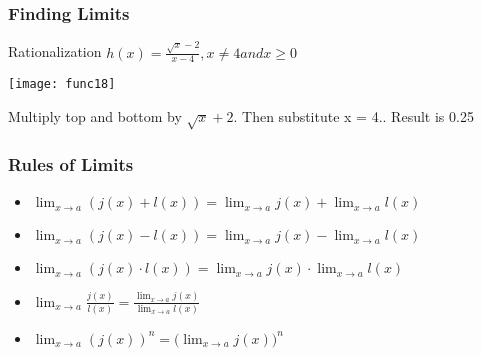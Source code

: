  \begin{frame}[fragile]\frametitle{Finding Limits}
Rationalization
$h(x) = \frac{\sqrt x - 2}{x - 4}, x \neq 4 and x \geq 0$
\begin{center}
\texttt{[image: func18]}
\end{center}
Multiply top and bottom by $\sqrt x + 2$. Then substitute x = 4.. Result is 0.25
\end{frame}


 \begin{frame}[fragile]\frametitle{Rules of Limits}
\begin{itemize}
\item $\lim_{x \to a} (j(x) + l(x)) = \lim_{x \to a} j(x) + \lim_{x \to a} l(x)$
\item $\lim_{x \to a} (j(x) - l(x)) = \lim_{x \to a} j(x) - \lim_{x \to a} l(x)$
\item $\lim_{x \to a} (j(x) \cdot l(x)) = \lim_{x \to a} j(x) \cdot \lim_{x \to a} l(x)$
\item $\lim_{x \to a} \frac{j(x)}{l(x)} = \frac{\lim_{x \to a} j(x)}{\lim_{x \to a} l(x)}$
\item $\lim_{x \to a} (j(x))^{n} = \Big(\lim_{x \to a} j(x)\Big)^{n}$
\end{itemize}

\end{frame}




 



